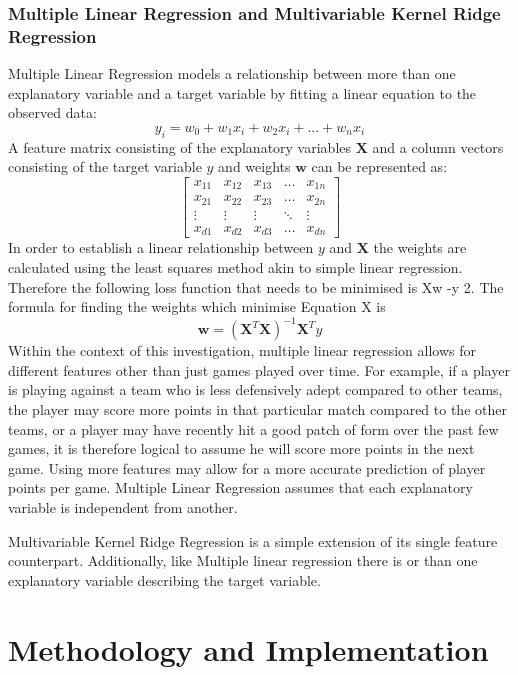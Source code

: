 \documentclass[a4paper,11pt,twoside]{article}
\begin{document}
\subsubsection{Multiple Linear Regression and Multivariable Kernel Ridge Regression}

Multiple Linear Regression models a relationship between more than one explanatory variable and a target variable by fitting a linear equation to the observed data:
\begin{equation}
y_{i} = w_{0} + w_{1}x_{i} + w_{2}x_{i} +  ... + w_{n}x_{i}
\end{equation}
A feature matrix consisting of the explanatory variables $\textbf{X}$ and a column vectors consisting of the target variable $y$ and weights $\textbf{w}$ can be represented as:
\[
\begin{bmatrix}
    x_{11} & x_{12} & x_{13} & \dots  & x_{1n} \\
    x_{21} & x_{22} & x_{23} & \dots  & x_{2n} \\
    \vdots & \vdots & \vdots & \ddots & \vdots \\
    x_{d1} & x_{d2} & x_{d3} & \dots  & x_{dn}
\end{bmatrix}
\]
In order to establish a linear relationship between $y$ and $\textbf{X}$ the weights are calculated using the least squares method akin to simple linear regression. Therefore the following loss function that needs to be minimised is Xw -y 2. The formula for finding the weights which minimise Equation X is
\begin{equation}
\textbf{w} = (\textbf{X}^T\textbf{X})^{-1}\textbf{X}^Ty
\end{equation}
Within the context of this investigation, multiple linear regression allows for different features other than just games played over time. For example, if a player is playing against a team who is less defensively adept compared to other teams, the player may score more points in that particular match compared to the other teams, or a player may have recently hit a good patch of form over the past few games, it is therefore logical to assume he will score more points in the next game. Using more features may allow for a more accurate prediction of player points per game. Multiple Linear Regression assumes that each explanatory variable is independent from another.

Multivariable Kernel Ridge Regression is a simple extension of its single feature counterpart. Additionally, like Multiple linear regression  there is or than one explanatory variable describing the target variable. 






\section{Methodology and Implementation}
\end{document}
